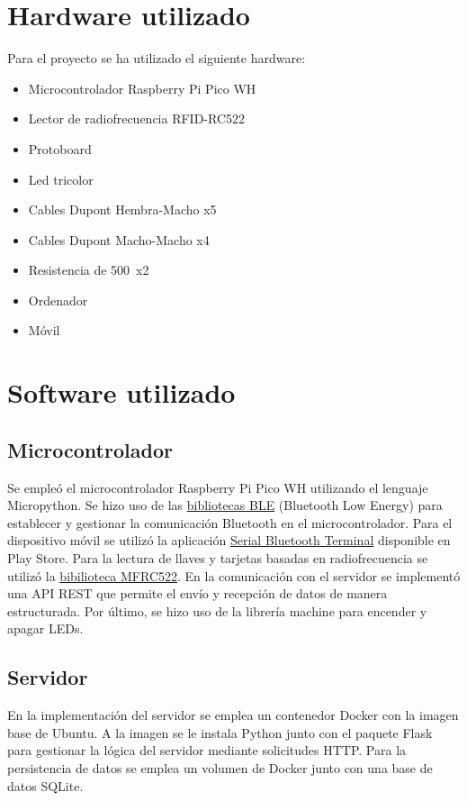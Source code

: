 \documentclass{article}
\begin{document}
\section{Hardware utilizado}
Para el proyecto se ha utilizado el siguiente hardware:
\begin{itemize}
	\item Microcontrolador Raspberry Pi Pico WH
	\item Lector de radiofrecuencia RFID-RC522
	\item Protoboard
	\item Led tricolor
	\item Cables Dupont Hembra-Macho x5
	\item Cables Dupont Macho-Macho x4
	\item Resistencia de 500\textOmega\ x2
	\item Ordenador
	\item Móvil

\end{itemize}

\section{Software utilizado}
\subsection{Microcontrolador}
Se empleó el microcontrolador Raspberry Pi Pico WH utilizando el lenguaje Micropython. Se hizo uso de las \href{https://github.com/micropython/micropython/tree/master/examples/bluetooth}{bibliotecas BLE} (Bluetooth Low Energy) para establecer y gestionar la comunicación Bluetooth en el microcontrolador. Para el dispositivo móvil se utilizó la aplicación \href{https://play.google.com/store/apps/details?id=de.kai_morich.serial_usb_terminal&pcampaignid=web_share}{Serial Bluetooth Terminal} disponible en Play Store. Para la lectura de llaves y tarjetas basadas en radiofrecuencia se utilizó la \href{https://github.com/danjperron/micropython-mfrc522/blob/master/mfrc522.py}{bibilioteca MFRC522}. En la comunicación con el servidor se implementó una API REST que permite el envío y recepción de datos de manera estructurada. Por último, se hizo uso de la librería machine para encender y apagar LEDs.

\subsection{Servidor}
En la implementación del servidor se emplea un contenedor Docker con la imagen base de Ubuntu. A la imagen se le instala Python junto con el paquete Flask para gestionar la lógica del servidor mediante solicitudes HTTP. Para la persistencia de datos se emplea un volumen de Docker junto con una base de datos SQLite.
\end{document}
